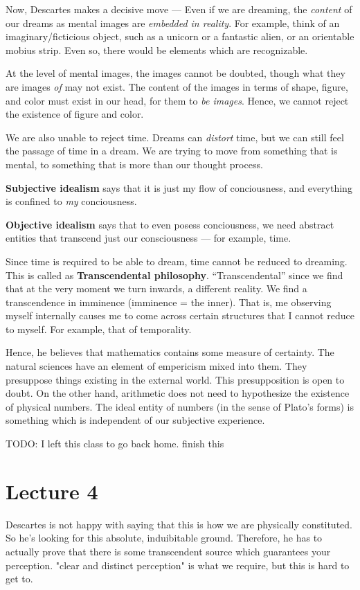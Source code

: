 \documentclass[11pt]{book}
\begin{document}
Now, Descartes makes a decisive move --- Even if we are dreaming,
the \textit{content} of our dreams as mental images are
\textit{embedded in reality}.
For example, think of an imaginary/ficticious object, such
as a unicorn or a fantastic alien, or an orientable mobius strip.
Even so, there would be elements which are recognizable.

At the level of mental images, the images cannot be doubted, though
what they are images \textit{of} may not exist. The content
of the images in terms of shape, figure, and color must exist in our head,
for them to \textit{be images}. Hence, we cannot reject the existence
of figure and color.

We are also unable to reject time. Dreams can \textit{distort} time, but
we can still feel the passage of time in a dream. We are trying to move
from something that is mental, to something that is more than our thought
process.

\textbf{Subjective idealism} says that it is just my flow of conciousness,
and everything is confined to \textit{my} conciousness.

\textbf{Objective idealism} says that to even posess conciousness, we need
abstract entities that transcend just our consciousness --- for example,
time.

Since time is required to be able to dream, time cannot be reduced
to dreaming. This is called as \textbf{Transcendental philosophy}.
``Transcendental'' since we find that at the very moment we
turn inwards, a different reality. We find a transcendence in
imminence (imminence = the inner). That is, me observing
myself internally causes me to come across certain structures that
I cannot reduce to myself. For example, that of temporality.

Hence, he believes that mathematics contains some measure of
certainty. The natural sciences have an element of empericism
mixed into them. They presuppose things existing in the external
world. This presupposition is open to doubt. On the other hand,
arithmetic does not need to hypothesize the existence of
physical numbers. The ideal entity of numbers (in the sense of Plato's forms)
is something which is independent of our subjective experience.

TODO: I left this class to go back home. finish this

\chapter{Lecture 4}
Descartes is not happy with saying that this is how we are physically
constituted. So he's looking for this absolute, induibitable ground. Therefore,
he has to actually prove that there is some transcendent source which
guarantees your perception. "clear and distinct perception" is what we require,
but this is hard to get to.
\end{document}
